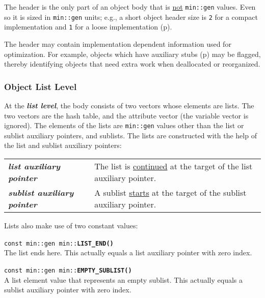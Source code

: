 \documentclass[12pt]{article}
\makeatletter
\newcommand{\TT}[1]{{\tt \bfseries #1}}
\newcommand{\key}[1]{{\bf \em #1}\index{#1}}
\newcommand{\ttindex}[1]{\index{#1@{\tt #1}}}
\newcommand{\pagref}[1]{p\pageref{#1}}
\newenvironment{indpar}[1][0.3in]%
	{\begin{list}{}%
		     {\setlength{\itemsep}{0in}%
		      \setlength{\topsep}{0in}%
		      \setlength{\parsep}{1ex}%
		      \setlength{\labelwidth}{#1}%
		      \setlength{\leftmargin}{#1}%
		      \addtolength{\leftmargin}{\labelsep}}%
	 \item}%
	{\end{list}}
\newcommand{\LABEL}[1]{\label{#1}}
\newcommand{\MINKEY}[1]%
	   {\TT{#1}\ttindex{min::#1}\ttindex{#1}}
\makeatother
\begin{document}
The header is the only part of an object body that is
\underline{not} \verb|min::gen| values.  Even so it is
sized in \verb|min::gen| units; e.g., a short object header size
is {\tt 2} for a compact implementation and {\tt 1}
for a loose implementation (\pagref{COMPACT-OR-LOOSE}).

The header may contain implementation dependent information used
for optimization.
For example, objects which have auxiliary stubs
(\pagref{OBJECT-AUXILIARY-STUBS})
may be flagged, thereby identifying objects that need extra work
when deallocated or reorganized.

\subsubsection{Object List Level}
\label{OBJECT-LIST-LEVEL}

At the \key{list level},\label{LIST-LEVEL}
the body consists of two vectors whose
elements are lists.  The two vectors are the hash table, and the
attribute vector (the variable vector is ignored).
The elements of the lists are
\verb|min::gen| values other than the list or sublist auxiliary
pointers, and sublists.  The lists are constructed with
the help of the list and sublist auxiliary pointers:

\begin{center}
\begin{tabular}{lp{3in}}
\key{list auxiliary pointer} &
The list is \underline{continued} at the target of the list auxiliary pointer.
\\[2ex]
\key{sublist auxiliary pointer}	&
A sublist \underline{starts} at the target of the sublist auxiliary pointer.
\end{tabular}
\end{center}

Lists also make use of two constant values:

\begin{indpar}
\begin{list}{}{}
\item[{\tt const min::gen min::}\MINKEY{LIST\_END()}]~\LABEL{MIN::LIST_END}\\
The list ends here.
This actually equals a list auxiliary pointer with zero index.
\item[{\tt const min::gen min::}\MINKEY{EMPTY\_SUBLIST()}]~%
	\LABEL{MIN::EMPTY_SUBLIST}\\
A list element value that represents an empty sublist.
This actually equals a sublist auxiliary pointer with zero index.
\end{list}
\end{indpar}
\end{document}
